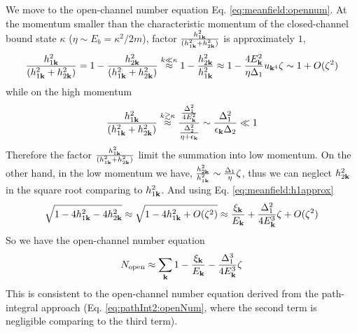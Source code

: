 We move to the open-channel number equation Eq. \ref{eq:meanfield:opennum}.  At the momentum smaller than the characteristic momentum of the closed-channel bound state $\kappa$  ($\eta\sim{}E_{b}=\kappa^{2}/2m$), factor $\frac{ h_{1\mathbf{k}}^2}{( h_{1\mathbf{k}}^2+ h_{2\mathbf{k}}^2)} $ is approximately $1$,
\begin{equation*}
\frac{ h_{1\mathbf{k}}^2}{( h_{1\mathbf{k}}^2+ h_{2\mathbf{k}}^2)} =1-\frac{h_{2\mathbf{k}}^2}{( h_{1\mathbf{k}}^2+ h_{2\mathbf{k}}^2)}
\overset{k\ll{}\kappa}\approx1-\frac{h_{2\mathbf{k}}^2}{h_{1\mathbf{k}}^2}
\approx1-\frac{4E_{\mathbf{k}}^{2}}{\eta\Delta_{1}}u_{\mathbf{k}^{4}}\zeta
\sim1+O(\zeta^{2})
\end{equation*}
while on the high momentum 
\begin{equation*}
\frac{ h_{1\mathbf{k}}^2}{( h_{1\mathbf{k}}^2+ h_{2\mathbf{k}}^2)}
\overset{k\gtrsim\kappa}\approx\frac{\frac{\Delta_{1}^{2}}{4E_{\mathbf{k}}^{2}}}{\frac{\Delta_{2}^{2}}{\eta+\epsilon_{\mathbf{k}}}}
\sim\frac{\Delta_{1}^{2}}{\epsilon_{\mathbf{k}}\Delta_{2}}\ll1
\end{equation*}
Therefore the factor $\frac{ h_{1\mathbf{k}}^2}{( h_{1\mathbf{k}}^2+ h_{2\mathbf{k}}^2)} $ limit the summation into  low momentum.  On the other hand, in the low momentum we have, $\frac{h_{2\mathbf{k}}^{2}}{h_{1\mathbf{k}}^{2}}\sim\frac{\Delta_{1}}{\eta}\zeta$, thus we can neglect $h_{2\mathbf{k}}^{2}$ in the square root comparing to $h_{1\mathbf{k}}^{2}$. And using Eq. \ref{eq:meanfield:h1approx}
\begin{equation*}
\sqrt{1-4 h_{1\mathbf{k}}^2-4 h_{2\mathbf{k}}^2}\approx\sqrt{1-4h_{1\mathbf{k}}^{2}+O({\zeta}^{2})}
	\approx\frac{\xi_{\mathbf{k}}}{E_{\mathbf{k}}}+\frac{\Delta_{1}^{2}}{4E_{\mathbf{k}}^{3}}\zeta+O({\zeta}^{2})
\end{equation*}
So we have the open-channel number equation 
\begin{equation}
N_{\text{open}}\approx\sum_{\mathbf{k}}1-\frac{\xi_{\mathbf{k}}}{E_{\mathbf{k}}}-\frac{\Delta_{1}^{3}}{4E_{\mathbf{k}}^{3}}\zeta
\end{equation}
This is consistent to the open-channel number equation derived from the path-integral approach  (Eq. \ref{eq:pathInt2:openNum}, where the second term is negligible comparing to the third term).

